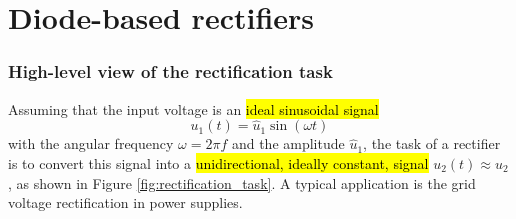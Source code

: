 \section{Diode-based rectifiers}

\begin{frame}
    \frametitle{High-level view of the rectification task}
    Assuming that the input voltage is an \hl{ideal sinusoidal signal} $$u_1(t) = \hat{u}_1 \sin(\omega t)$$ with the angular frequency $\omega = 2\pi f$ and the amplitude $\hat{u}_1$, the task of a rectifier is to convert this signal into a \hl{unidirectional, ideally constant, signal} $u_2(t)\approx u_2$, as shown in Figure \ref{fig:rectification_task}. A typical application is the grid voltage rectification in power supplies.


\end{frame}
